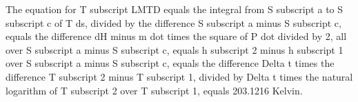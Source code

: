 The equation for T subscript LMTD equals the integral from S subscript a to S subscript c of T ds, divided by the difference S subscript a minus S subscript c, equals the difference dH minus m dot times the square of P dot divided by 2, all over S subscript a minus S subscript c, equals h subscript 2 minus h subscript 1 over S subscript a minus S subscript c, equals the difference Delta t times the difference T subscript 2 minus T subscript 1, divided by Delta t times the natural logarithm of T subscript 2 over T subscript 1, equals 203.1216 Kelvin.